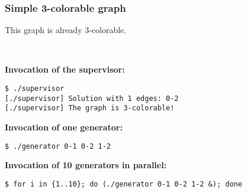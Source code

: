 \begin{multicols}{2}
\subsubsection*{Simple 3-colorable graph}


This graph is already 3-colorable.

\vfill

~

\columnbreak

\textbf{Invocation of the supervisor:}
\vspace{-5mm}
\begin{verbatim}
$ ./supervisor
[./supervisor] Solution with 1 edges: 0-2
[./supervisor] The graph is 3-colorable!
\end{verbatim}

\textbf{Invocation of one generator:}
\vspace{-5mm}
\begin{verbatim}
$ ./generator 0-1 0-2 1-2
\end{verbatim}

\textbf{Invocation of 10 generators in parallel:}
\vspace{-5mm}
\begin{verbatim}
$ for i in {1..10}; do (./generator 0-1 0-2 1-2 &); done
\end{verbatim}
\end{multicols}

